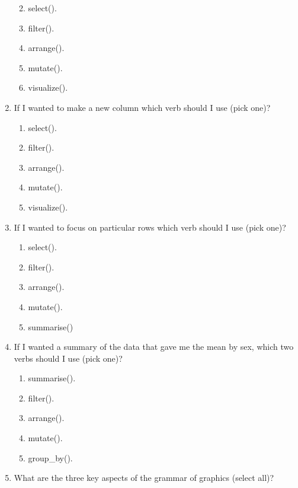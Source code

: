 \documentclass[
]{book}
\providecommand{\tightlist}{%
  \setlength{\itemsep}{0pt}\setlength{\parskip}{0pt}}
\begin{document}
\begin{enumerate}
  \begin{enumerate}
  \def\labelenumii{\alph{enumii}.}
  \tightlist
  \item
    select().
  \item
    filter().
  \item
    arrange().
  \item
    mutate().
  \item
    visualize().
  \end{enumerate}
\item
  If I wanted to make a new column which verb should I use (pick one)?

  \begin{enumerate}
  \def\labelenumii{\alph{enumii}.}
  \tightlist
  \item
    select().
  \item
    filter().
  \item
    arrange().
  \item
    mutate().
  \item
    visualize().
  \end{enumerate}
\item
  If I wanted to focus on particular rows which verb should I use (pick one)?

  \begin{enumerate}
  \def\labelenumii{\alph{enumii}.}
  \tightlist
  \item
    select().
  \item
    filter().
  \item
    arrange().
  \item
    mutate().
  \item
    summarise()
  \end{enumerate}
\item
  If I wanted a summary of the data that gave me the mean by sex, which two verbs should I use (pick one)?

  \begin{enumerate}
  \def\labelenumii{\alph{enumii}.}
  \tightlist
  \item
    summarise().
  \item
    filter().
  \item
    arrange().
  \item
    mutate().
  \item
    group\_by().
  \end{enumerate}
\item
  What are the three key aspects of the grammar of graphics (select all)?


\end{enumerate}
\end{document}
